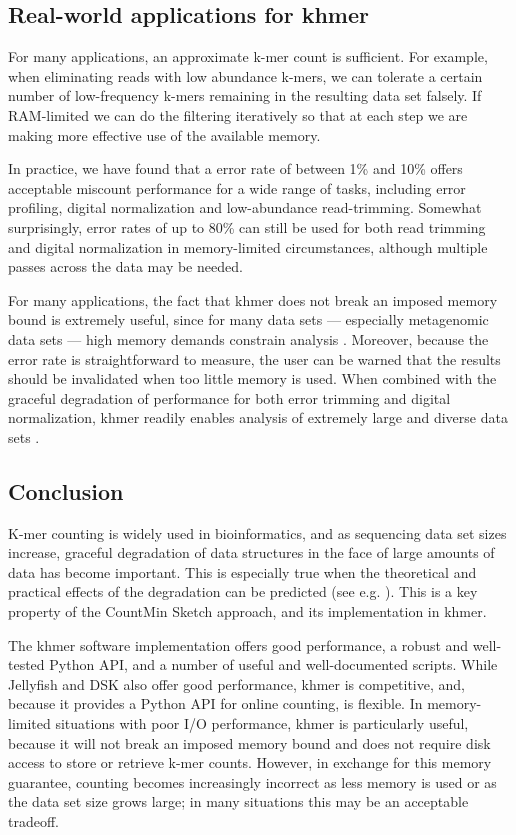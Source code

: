 \documentclass{article}
\begin{document}
\subsection{Real-world applications for khmer}

For many applications, an approximate k-mer count is sufficient.  For
example, when eliminating reads with low abundance k-mers, we
can tolerate a certain number of low-frequency k-mers remaining in
the resulting data set falsely.  If RAM-limited we can do the
filtering iteratively so that at each step we are making more
effective use of the available memory.

In practice, we have found that a error rate of between 1\%
and 10\% offers acceptable miscount performance for a wide range of
tasks, including error profiling, digital normalization and
low-abundance read-trimming.  Somewhat surprisingly, error
rates of up to 80\% can still be used for both read trimming and
digital normalization in memory-limited circumstances, although
multiple passes across the data may be needed.

For many applications, the fact that khmer does not break an imposed
memory bound is extremely useful, since for many data sets ---
especially metagenomic data sets --- high memory demands constrain analysis \cite{Howe2012,GAGE}.  Moreover, because the error
rate is straightforward to measure, the user can be warned that the
results should be invalidated when too little memory is used.  When combined
with the graceful degradation of performance for both error trimming
and digital normalization, khmer readily enables analysis of extremely
large and diverse data sets \cite{adina2013}.

\subsection{Conclusion}

K-mer counting is widely used in bioinformatics, and as sequencing data set sizes
increase, graceful degradation of data structures in the face of large
amounts of data has become important.  This is especially true when
the theoretical and practical effects of the degradation can be
predicted (see e.g. \cite{Melsted2011, Pell2012, Roy2013}).  This
is a key property of the CountMin Sketch
approach, and its implementation in khmer.

The khmer software implementation offers good performance, a robust
and well-tested Python API, and a number of useful and well-documented
scripts.  While Jellyfish and DSK also offer good performance,
khmer is competitive, and, because it provides a
Python API for online counting, is flexible.  In memory-limited
situations with poor I/O performance, khmer is particularly useful,
because it will not break an imposed memory bound and does not require
disk access to store or retrieve k-mer counts.  However, in exchange
for this memory guarantee, counting becomes increasingly incorrect as
less memory is used or as the data set size grows large; in many
situations this may be an acceptable tradeoff.
\end{document}
